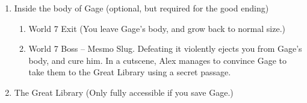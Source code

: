 \documentclass{gd-document}
\begin{document}
\begin{enumerate}
\begin{enumerate}
    \end{enumerate}

  \item Inside the body of Gage (optional, but required for the good
    ending)

    \begin{enumerate}
    \item World 7 Exit (You leave Gage's body, and grow back to normal
      size.)

    \item World 7 Boss – Mesmo Slug. Defeating it violently ejects you
      from Gage's body, and cure him. In a cutscene, Alex manages to
      convince Gage to take them to the Great Library using a secret
      passage.
    \end{enumerate}

  \item The Great Library (Only fully accessible if you save Gage.)


\end{enumerate}
\end{document}
